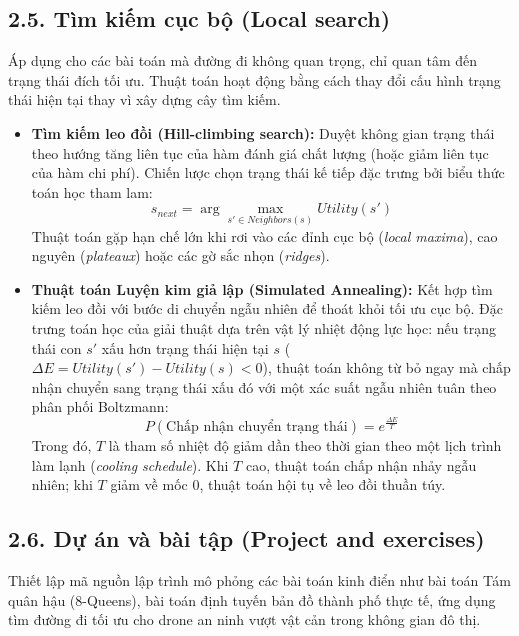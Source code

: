 \documentclass[11pt,a4paper]{article}
\begin{document}
\subsection{2.5. Tìm kiếm cục bộ (Local search)}
Áp dụng cho các bài toán mà đường đi không quan trọng, chỉ quan tâm đến trạng thái đích tối ưu. Thuật toán hoạt động bằng cách thay đổi cấu hình trạng thái hiện tại thay vì xây dựng cây tìm kiếm.
\begin{itemize}
    \item \textbf{Tìm kiếm leo đồi (Hill-climbing search):} Duyệt không gian trạng thái theo hướng tăng liên tục của hàm đánh giá chất lượng (hoặc giảm liên tục của hàm chi phí). Chiến lược chọn trạng thái kế tiếp đặc trưng bởi biểu thức toán học tham lam:
    \begin{equation}
        s_{next} = \arg\max_{s' \in Neighbors(s)} Utility(s')
    \end{equation}
    Thuật toán gặp hạn chế lớn khi rơi vào các đỉnh cục bộ (\textit{local maxima}), cao nguyên (\textit{plateaux}) hoặc các gờ sắc nhọn (\textit{ridges}).
    \item \textbf{Thuật toán Luyện kim giả lập (Simulated Annealing):} Kết hợp tìm kiếm leo đồi với bước di chuyển ngẫu nhiên để thoát khỏi tối ưu cục bộ. Đặc trưng toán học của giải thuật dựa trên vật lý nhiệt động lực học: nếu trạng thái con $s'$ xấu hơn trạng thái hiện tại $s$ ($\Delta E = Utility(s') - Utility(s) < 0$), thuật toán không từ bỏ ngay mà chấp nhận chuyển sang trạng thái xấu đó với một xác suất ngẫu nhiên tuân theo phân phối Boltzmann:
    \begin{equation}
        P(\text{Chấp nhận chuyển trạng thái}) = e^{\frac{\Delta E}{T}}
    \end{equation}
    Trong đó, $T$ là tham số nhiệt độ giảm dần theo thời gian theo một lịch trình làm lạnh (\textit{cooling schedule}). Khi $T$ cao, thuật toán chấp nhận nhảy ngẫu nhiên; khi $T$ giảm về mốc 0, thuật toán hội tụ về leo đồi thuần túy.
\end{itemize}

\subsection{2.6. Dự án và bài tập (Project and exercises)}
Thiết lập mã nguồn lập trình mô phỏng các bài toán kinh điển như bài toán Tám quân hậu (8-Queens), bài toán định tuyến bản đồ thành phố thực tế, ứng dụng tìm đường đi tối ưu cho drone an ninh vượt vật cản trong không gian đô thị.
\end{document}
